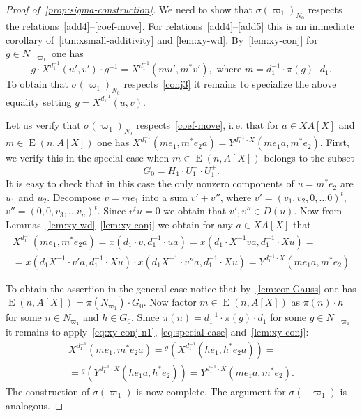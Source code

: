 \documentclass[oneside, 10pt]{amsart}
\DeclareMathOperator{\E}{E}
\numberwithin{equation}{section}
\numberwithin{thm}{section}
\numberwithin{lemma}{section}
\theoremstyle{definition}
\theoremstyle{remark}
\begin{document}
\begin{proof}[Proof of~\cref{prop:sigma-construction}]
We need to show that $\sigma(\varpi_1)_{N_0}$ respects the relations~\eqref{add4}--\eqref{coef-move}.
For relations~\eqref{add4}--\eqref{add5} this is an immediate corollary of~\cref{itm:xsmall-additivity} and \cref{lem:xy-wd}.
By~\cref{lem:xy-conj} for $g \in N_{-\varpi_1}$ one has
\begin{equation}
\label{eq:xy-conj-n1}
g \cdot X^{d_1^{-1}}(u', v') \cdot g^{-1} = X^{d_1^{-1}}(mu', m^*v'), \text{ where } m = d_1^{-1} \cdot \pi(g) \cdot d_1.
\end{equation}
To obtain that $\sigma(\varpi_1)_{N_0}$ respects~\eqref{conj3} it remains to specialize the above equality setting $g = X^{d_1^{-1}}(u, v)$.

Let us verify that $\sigma(\varpi_1)_{N_0}$ respects~\eqref{coef-move}, i.\,e. that for $a\in XA[X]$ and $m \in \E(n, A[X])$ one has
$X^{d_1^{-1}}(me_1, m^*e_2 a) = Y^{d_1^{-1} \cdot X}(me_1 a, m^* e_2)$.
First, we verify this in the special case when $m \in \E(n, A[X])$ belongs to the subset
\[G_0 = H_{1} \cdot U^-_1 \cdot U^+_1.\]
It is easy to check that in this case the only nonzero components of $u = m^* e_2$ are $u_1$ and $u_2$.
Decompose $v = m e_1$ into a sum $v' + v''$, where $v' = (v_1, v_2, 0, \ldots 0)^t,$ $v'' = (0, 0, v_3, \ldots v_n)^t$.
Since $v^t u = 0$ we obtain that $v', v'' \in D(u)$.
Now from Lemmas~\ref{lem:xy-wd}--\ref{lem:xy-conj} we obtain for any $a \in XA[X]$ that
\begin{multline}
\label{eq:special-case}
X^{d_1^{-1}}(me_1, m^*e_2 a) =
x(d_1 \cdot v, d_{1}^{-1} \cdot u a) =
x(d_1 \cdot X^{-1} va, d_1^{-1} \cdot X u) = \\
= x(d_1 X^{-1} \cdot v'a, d_1^{-1}\cdot X u) \cdot x(d_1 X^{-1}\cdot v''a, d_1^{-1} \cdot X u) =
Y^{d_1^{-1} \cdot X}(me_{1}a, m^* e_2)
\end{multline}

To obtain the assertion in the general case notice that by~\cref{lem:cor-Gauss} one has $\E(n, A[X]) = \pi(N_{\varpi_1}) \cdot G_0$.
Now factor $m \in \E(n, A[X])$ as $\pi(n) \cdot h$ for some $n\in N_{\varpi_1}$ and $h \in G_0$.
Since $\pi(n) = d_1^{-1} \cdot \pi(g) \cdot d_1$ for some $g \in N_{-\varpi_1}$ it remains to apply~\eqref{eq:xy-conj-n1}, \eqref{eq:special-case} and~\cref{lem:xy-conj}:
\begin{multline}
\nonumber X^{d_1^{-1}}(me_1, m^*e_{2}a) = {}^{g}(X^{d_1^{-1}}(he_1, h^*e_{2}a)) = \\
= {}^{g}(Y^{d_1^{-1} \cdot X}(he_{1}a, h^*e_2)) = Y^{d_1^{-1} \cdot X}(me_{1}a, m^{*} e_{2}).
\end{multline}
The construction of $\sigma(\varpi_1)$ is now complete.
The argument for $\sigma(-\varpi_1)$ is analogous.
\end{proof}
\end{document}

